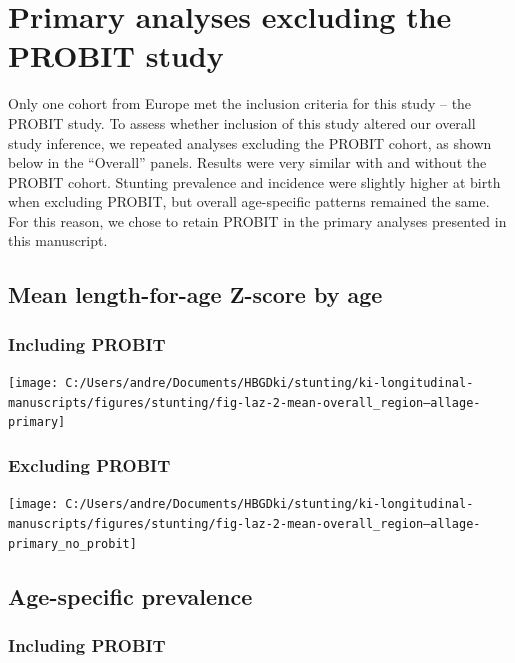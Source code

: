 \documentclass[
  9pt,
]{book}
\begin{document}
\hypertarget{exclude-PROBIT}{%
\chapter{Primary analyses excluding the PROBIT study}\label{exclude-PROBIT}}

\raggedright

Only one cohort from Europe met the inclusion criteria for this study -- the PROBIT study. To assess whether inclusion of this study altered our overall study inference, we repeated analyses excluding the PROBIT cohort, as shown below in the ``Overall'' panels. Results were very similar with and without the PROBIT cohort. Stunting prevalence and incidence were slightly higher at birth when excluding PROBIT, but overall age-specific patterns remained the same. For this reason, we chose to retain PROBIT in the primary analyses presented in this manuscript.

\hypertarget{mean-length-for-age-z-score-by-age-1}{%
\section{Mean length-for-age Z-score by age}\label{mean-length-for-age-z-score-by-age-1}}

\hypertarget{including-probit}{%
\subsection{Including PROBIT}\label{including-probit}}

\texttt{[image: C:/Users/andre/Documents/HBGDki/stunting/ki-longitudinal-manuscripts/figures/stunting/fig-laz-2-mean-overall\_region--allage-primary]}

\hypertarget{excluding-probit}{%
\subsection{Excluding PROBIT}\label{excluding-probit}}

\texttt{[image: C:/Users/andre/Documents/HBGDki/stunting/ki-longitudinal-manuscripts/figures/stunting/fig-laz-2-mean-overall\_region--allage-primary\_no\_probit]}

\hypertarget{age-specific-prevalence-1}{%
\section{Age-specific prevalence}\label{age-specific-prevalence-1}}

\hypertarget{including-probit-1}{%
\subsection{Including PROBIT}\label{including-probit-1}}
\end{document}
